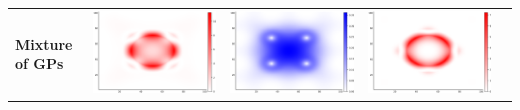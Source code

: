 \documentclass{article}
\numberwithin{equation}{section}
\begin{document}
\begin{table}
\begin{tabularx}{\textwidth}{| X | p{} p{} || p{} p{} |}
    \hline
    \centering \textbf{Mixture of GPs} &
      \parbox[c]{.18\textwidth}{\includegraphics[scale=0.2]{figures/heatmaps/error-mixture-16.png}} &
      \parbox[c]{.18\textwidth}{\includegraphics[scale=0.2]{figures/heatmaps/variance-mixture-16.png}} &
      \parbox[c]{.18\textwidth}{\includegraphics[scale=0.2]{figures/heatmaps/error-mixture-25.png}} &

\end{tabularx}
\end{table}
\end{document}
